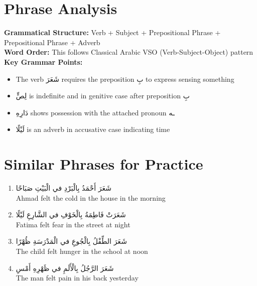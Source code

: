 \documentclass[a4paper,12pt]{article}
\begin{document}
\section{Phrase Analysis}

\begin{tcolorbox}[colback=boxcolor,colframe=headercolor]
\textbf{Grammatical Structure:} Verb + Subject + Prepositional Phrase + Prepositional Phrase + Adverb
\\[1em]
\textbf{Word Order:} This follows Classical Arabic VSO (Verb-Subject-Object) pattern
\\[1em]
\textbf{Key Grammar Points:}
\begin{itemize}
\item The verb \textarabic{شَعَرَ} requires the preposition \textarabic{بِ} to express sensing something
\item \textarabic{لِصٍّ} is indefinite and in genitive case after preposition \textarabic{بِ}
\item \textarabic{دَارِهِ} shows possession with the attached pronoun \textarabic{ـه}
\item \textarabic{لَيْلًا} is an adverb in accusative case indicating time
\end{itemize}
\end{tcolorbox}

\section{Similar Phrases for Practice}

\begin{enumerate}
\item \textarabic{شَعَرَ أَحْمَدُ بِالْبَرْدِ في الْبَيْتِ صَبَاحًا}
\\Ahmad felt the cold in the house in the morning

\item \textarabic{شَعَرَتْ فَاطِمَةُ بِالْخَوْفِ في الشَّارِعِ لَيْلًا}
\\Fatima felt fear in the street at night

\item \textarabic{شَعَرَ الطِّفْلُ بِالْجُوعِ في الْمَدْرَسَةِ ظُهْرًا}
\\The child felt hunger in the school at noon

\item \textarabic{شَعَرَ الرَّجُلُ بِالْأَلَمِ في ظَهْرِهِ أَمْسِ}
\\The man felt pain in his back yesterday
\end{enumerate}
\end{document}
